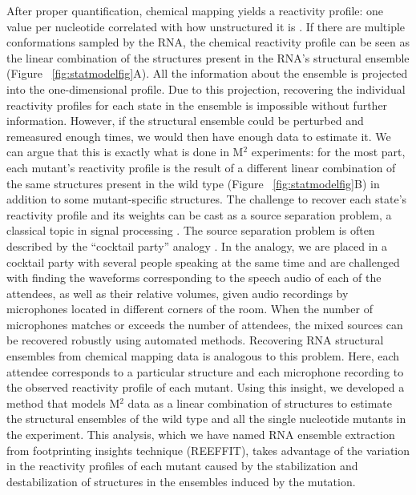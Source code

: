 \documentclass[12pt]{article}
\begin{document}
After proper quantification, chemical mapping yields a reactivity profile: one value per nucleotide correlated with how unstructured it is \cite{Mitra2008,Yoon2011}. 
If there are multiple conformations sampled by the RNA, the chemical reactivity profile can be seen as the linear combination of the structures present in the RNA's structural ensemble (Figure ~\ref{fig:statmodelfig}A).
 All the information about the ensemble is projected into the one-dimensional profile. 
 Due to this projection, recovering the individual reactivity profiles for each state in the ensemble is impossible without further information. 
 However, if the structural ensemble could be perturbed and remeasured enough times, we would then have enough data to estimate it. 
 We can argue that this is exactly what is done in M$^2$ experiments: for the most part, each mutant's reactivity profile is the result of a different linear combination of the same structures present in the wild type (Figure ~\ref{fig:statmodelfig}B) in addition to some mutant-specific structures. 
 The challenge to recover each state's reactivity profile and its weights can be cast as a source separation problem, a classical topic in signal processing \cite{Attias1999,Cardoso1998}. 
 The source separation problem is often described by the ``cocktail party'' analogy \cite{Cardoso1998}. 
 In the analogy, we are placed in a cocktail party with several people speaking at the same time and are challenged with finding the waveforms corresponding to the speech audio of each of the attendees, as well as their relative volumes, given audio recordings by microphones located in different corners of the room. 
 When the number of microphones matches or exceeds the number of attendees, the mixed sources can be recovered robustly using automated methods. 
 Recovering RNA structural ensembles from chemical mapping data is analogous to this problem. 
 Here, each attendee corresponds to a particular structure and each microphone recording to the observed reactivity profile of each mutant. 
 Using this insight, we developed a method that models M$^2$ data as a linear combination of structures to estimate the structural ensembles of the wild type and all the single nucleotide mutants in the experiment. 
 This analysis, which we have named RNA ensemble extraction from footprinting insights technique (REEFFIT), takes advantage of the variation in the reactivity profiles of each mutant caused by the stabilization and destabilization of structures in the ensembles induced by the mutation. 
\end{document}
